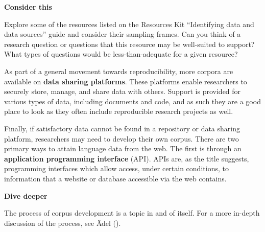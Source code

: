 \documentclass[
  letterpaper,
  krantz1]{latex/krantz-mod}
\theoremstyle{definition}
\theoremstyle{definition}
\theoremstyle{remark}
\begin{document}
\begin{tcolorbox}[enhanced jigsaw, toprule=.15mm, breakable, colback=white, arc=.35mm, left=2mm, colframe=quarto-callout-color-frame, opacityback=0, bottomrule=.15mm, rightrule=.15mm, leftrule=.75mm]

\textbf{ Consider this}

Explore some of the resources listed on the Resources Kit ``Identifying
data and data sources'' guide and consider their sampling
frames. Can you think of a research
question or questions that this resource may be
well-suited to support? What types of questions would be
less-than-adequate for a given resource?

\end{tcolorbox}

As part of a general movement towards
reproducibility, more corpora
are available on \textbf{data sharing
platforms}. These platforms enable
researchers to securely store, manage, and share data with others.
Support is provided for various types of data, including documents and
code, and as such they are a good place to look as they often include
reproducible research projects as well.

Finally, if satisfactory data cannot be found in a repository or data
sharing platform, researchers may need to develop their own
corpus. There are two primary ways to attain
language data from the web. The first is through an \textbf{application
programming interface} (API).
APIs are, as the title
suggests, programming interfaces which allow access, under certain
conditions, to information that a website or database accessible via the
web contains.

\begin{tcolorbox}[enhanced jigsaw, toprule=.15mm, breakable, colback=white, arc=.35mm, left=2mm, colframe=quarto-callout-color-frame, opacityback=0, bottomrule=.15mm, rightrule=.15mm, leftrule=.75mm]

\textbf{ Dive deeper}

The process of corpus development is a topic
in and of itself. For a more in-depth discussion of the process, see
Ädel ().

\end{tcolorbox}
\end{document}
